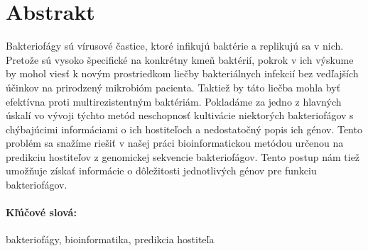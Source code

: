 \documentclass[12pt, oneside]{book}
\begin{document}
\newpage
\section*{Abstrakt}

Bakteriofágy sú vírusové častice, ktoré infikujú baktérie a replikujú sa v nich. Pretože sú vysoko špecifické na konkrétny kmeň baktérií, pokrok v ich výskume by mohol viesť k novým prostriedkom liečby bakteriálnych infekcií bez vedľajších účinkov na prirodzený mikrobióm pacienta. Taktiež by táto liečba mohla byť efektívna proti multirezistentným baktériám. Pokladáme za jedno z hlavných úskalí vo vývoji týchto metód neschopnosť kultivácie niektorých bakteriofágov s chýbajúcimi informáciami o ich hostiteľoch a nedostatočný popis ich génov. Tento problém sa snažíme riešiť v našej práci bioinformatickou metódou určenou na predikciu hostiteľov z genomickej sekvencie bakteriofágov. Tento postup nám tiež umožňuje získať informácie o dôležitosti jednotlivých génov pre funkciu bakteriofágov.

\paragraph*{Kľúčové slová:} bakteriofágy, bioinformatika, predikcia hostiteľa

%
%



\newpage 

\tableofcontents



\newpage 

\listoffigures
\listoftables

\end{document}

